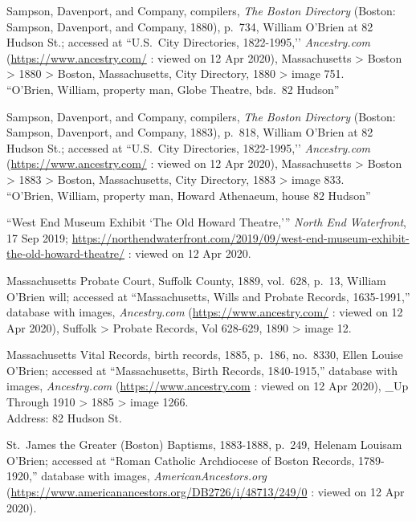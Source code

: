 \begin{thebibliography}{99}
	Sampson, Davenport, and Company, compilers, \textit{The Boston Directory} (Boston: Sampson, Davenport, and Company, 1880), p.\ 734, William O'Brien at 82 Hudson St.; accessed at ``U.S.\ City Directories, 1822-1995,’’ \textit{Ancestry.com} (\url{https://www.ancestry.com/} : viewed on 12 Apr 2020), Massachusetts > Boston > 1880 > Boston, Massachusetts, City Directory, 1880 > image 751.\\
	``O'Brien, William, property man, Globe Theatre, bds.\ 82 Hudson''
	
	Sampson, Davenport, and Company, compilers, \textit{The Boston Directory} (Boston: Sampson, Davenport, and Company, 1883), p.\ 818, William O'Brien at 82 Hudson St.; accessed at ``U.S.\ City Directories, 1822-1995,’’ \textit{Ancestry.com} (\url{https://www.ancestry.com/} : viewed on 12 Apr 2020), Massachusetts > Boston > 1883 > Boston, Massachusetts, City Directory, 1883 > image 833.\\
	``O'Brien, William, property man, Howard Athenaeum, house 82 Hudson''
	
	``West End Museum Exhibit `The Old Howard Theatre,''' \textit{North End Waterfront}, 17 Sep 2019;  \url{https://northendwaterfront.com/2019/09/west-end-museum-exhibit-the-old-howard-theatre/} : viewed on 12 Apr 2020.
	
	Massachusetts Probate Court, Suffolk County, 1889, vol.\ 628, p.\ 13, William O'Brien will; accessed at ``Massachusetts, Wills and Probate Records, 1635-1991,'' database with images, \textit{Ancestry.com} (\url{https://www.ancestry.com/} : viewed on 12 Apr 2020), Suffolk > Probate Records, Vol 628-629, 1890 > image 12.
	
	Massachusetts Vital Records, birth records, 1885, p.\ 186, no.\ 8330, Ellen Louise O'Brien; accessed at ``Massachusetts, Birth Records, 1840-1915,'' database with images, \textit{Ancestry.com} (\url{https://www.ancestry.com} : viewed on 12 Apr 2020), \_Up Through 1910 > 1885 > image 1266.\\
	Address: 82 Hudson St.
	
	St.\ James the Greater (Boston) Baptisms, 1883-1888, p.\ 249, Helenam Louisam O'Brien; accessed at ``Roman Catholic Archdiocese of Boston Records, 1789-1920,'' database with images, \textit{AmericanAncestors.org} (\url{https://www.americanancestors.org/DB2726/i/48713/249/0} : viewed on 12 Apr 2020).
	

\end{thebibliography}
